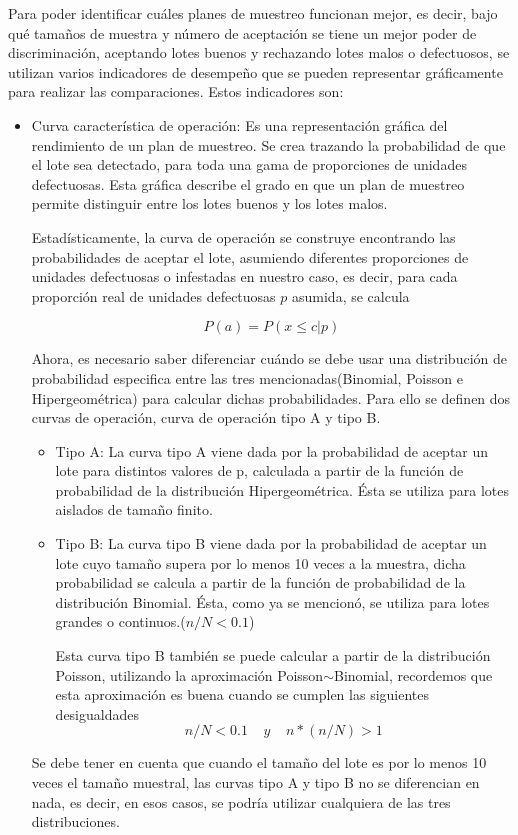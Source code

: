 Para poder identificar cu\'{a}les planes de muestreo funcionan mejor, es decir, bajo qu\'{e} tama\~{n}os de muestra y n\'{u}mero de aceptaci\'{o}n se tiene un mejor poder de discriminaci\'{o}n, aceptando lotes buenos y rechazando lotes malos o defectuosos, se utilizan varios indicadores de desempe\~{n}o que se pueden representar gr\'{a}ficamente para realizar las comparaciones. Estos indicadores son:
\begin{itemize}
\item Curva caracter\'{i}stica de operaci\'{o}n: Es una representaci\'{o}n gr\'{a}fica del rendimiento de un plan de muestreo. Se crea trazando la probabilidad de que el lote sea detectado, para toda una gama de proporciones de unidades defectuosas. Esta gr\'{a}fica describe el grado en que un plan de muestreo permite distinguir entre los lotes buenos y los lotes malos. \cite{OPE} 

Estad\'{i}sticamente, la curva de operaci\'{o}n se construye encontrando las probabilidades de aceptar el lote, asumiendo diferentes proporciones de unidades defectuosas o infestadas en nuestro caso, es decir, para cada proporci\'{o}n real de unidades defectuosas $p$ asumida, se calcula

$$P(a)=P(x\leq c | p)$$

Ahora, es necesario saber diferenciar cu\'{a}ndo se debe usar una distribuci\'{o}n de probabilidad especifica entre las tres mencionadas(Binomial, Poisson e Hipergeom\'{e}trica) para calcular dichas probabilidades. Para ello se definen dos curvas de operaci\'{o}n, curva de operaci\'{o}n tipo A y tipo B.
\begin{itemize}
\item Tipo A: La curva tipo A viene dada por la probabilidad de aceptar un lote para distintos valores de p, calculada a partir de la funci\'{o}n de probabilidad de la distribuci\'{o}n Hipergeom\'{e}trica. \'{E}sta se utiliza para lotes aislados de tama\~{n}o finito.
\item Tipo B: La curva tipo B viene dada por la probabilidad de aceptar un lote cuyo tama\~{n}o supera por lo menos 10 veces a la muestra, dicha probabilidad se calcula a partir de la funci\'{o}n de probabilidad de la distribuci\'{o}n Binomial. \'{E}sta, como ya se mencion\'{o}, se utiliza para lotes grandes o continuos.($n/N<0.1$)

Esta curva tipo B tambi\'{e}n se puede calcular a partir de la distribuci\'{o}n Poisson, utilizando la aproximaci\'{o}n Poisson$\sim$Binomial, recordemos que esta aproximaci\'{o}n es buena cuando se cumplen las siguientes desigualdades
$$ n/N<0.1 \;\;\;\; y \;\;\;\; n*(n/N)>1 $$
\end{itemize}
Se debe tener en cuenta que cuando el tama\~{n}o del lote es por lo menos 10 veces el tama\~{n}o muestral, las curvas tipo A y tipo B no se diferencian en nada, es decir, en esos casos, se podr\'{i}a utilizar cualquiera de las tres distribuciones.


\end{itemize}
